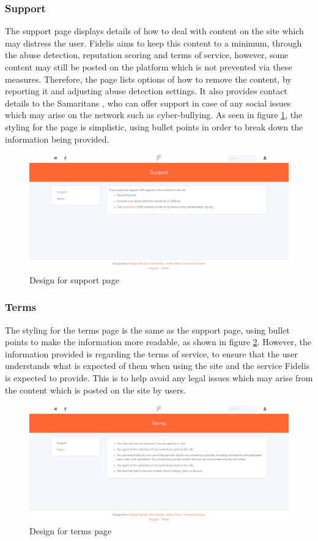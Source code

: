 \subsubsection{Support}
The support page displays details of how to deal with content on the site which may distress the user. Fidelis aims to keep this content to a minimum, through the abuse detection, reputation scoring and terms of service, however, some content may still be posted on the platform which is not prevented via these measures. Therefore, the page lists options of how to remove the content, by reporting it and adjusting abuse detection settings. It also provides contact details to the Samaritans \cite{Samaritans:Home}, who can offer support in case of any social issues which may arise on the network such as cyber-bullying. As seen in figure \ref{fig:support}, the styling for the page is simplistic, using bullet points in order to break down the information being provided.

\begin{figure}[H]
\centering
\includegraphics[height=2in]{Images/Design/support-page}
\caption{Design for support page}
\label{fig:support}
\end{figure}

\subsubsection{Terms}
The styling for the terms page is the same as the support page, using bullet points to make the information more readable, as shown in figure \ref{fig:terms}. However, the information provided is regarding the terms of service, to ensure that the user understands what is expected of them when using the site and the service Fidelis is expected to provide. This is to help avoid any legal issues which may arise from the content which is posted on the site by users.

\begin{figure}[H]
\centering
\includegraphics[height=2in]{Images/Design/terms-page}
\caption{Design for terms page}
\label{fig:terms}
\end{figure}

